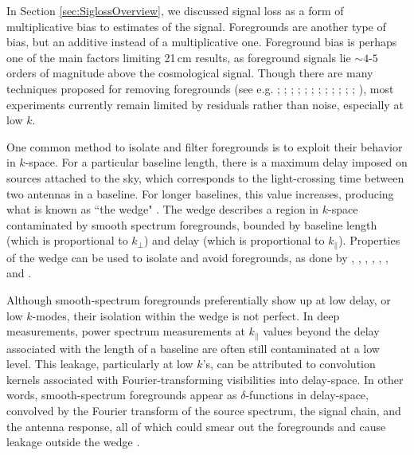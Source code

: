 \documentclass[preprint2,numberedappendix,tighten]{aastex6}  %
\begin{document}
In Section \ref{sec:SiglossOverview}, we discussed signal loss as a form of multiplicative bias to estimates of the signal. Foregrounds are another type of bias, but an additive instead of a multiplicative one. Foreground bias is perhaps one of the main factors limiting 21\,cm results, as foreground signals lie $\sim4$-$5$ orders of 
magnitude above the cosmological signal. Though there are many techniques proposed for removing foregrounds (see e.g. \citealt{vedantham_et_al2012}; \citealt{chapman_et_al2012}; \citealt{parsons_et_al2012a}; \citealt{parsons_et_al2012b}; \citealt{dillon_et_al2013a}; \citealt{wang_et_al2013}; \citealt{parsons_et_al2014}; \citealt{liu_et_al2014a}; \citealt{wolz_et_al2014}; \citealt{liu_et_al2014b}; \citealt{dillon_et_al2015}; \citealt{pober_et_al2016a}; \citealt{trott_et_al2016}), most 
experiments currently remain limited by residuals rather than noise, especially at low $k$.

One common method to isolate and filter foregrounds is to exploit their behavior in $k$-space. For a particular 
baseline length, there is a maximum delay imposed on sources attached to the sky, which corresponds to the light-crossing time between two 
antennas in a baseline. For longer baselines, this value increases, producing what is known as ``the 
wedge"
\citep{datta_et_al2010, parsons_et_al2012b, vedantham_et_al2012, pober_et_al2013, thyagarajan_et_al2013, liu_et_al2014a, liu_et_al2014b, patil_et_al2017}. 
The wedge describes a region in $k$-space contaminated by smooth spectrum foregrounds, bounded by baseline length (which is proportional to $k_{\perp}$) and delay (which is 
proportional to $k_{\parallel}$). Properties of the wedge can be used to isolate and 
avoid foregrounds, as done by , 
\citet{parsons_et_al2014}, \citet{dillon_et_al2014}, \citet{dillon_et_al2015}, \citet{jacobs_et_al2015}, \citet{beardsley_et_al2016}, and \citet{trott_et_al2016}.

Although smooth-spectrum foregrounds preferentially show up at low delay, or low $k$-modes, their isolation within the wedge is not perfect. In deep measurements, power spectrum measurements at $k_{\parallel}$ values beyond 
the delay associated with the length of a baseline are often still contaminated at a low level. This leakage, particularly at low $k$'s, can be attributed to 
convolution kernels associated with Fourier-transforming visibilities into delay-space. In other words, smooth-spectrum 
foregrounds appear as $\delta$-functions in delay-space, convolved by the Fourier transform of the source spectrum, the signal chain, and the 
antenna response, all of which could smear out the foregrounds and cause leakage outside the wedge \citep[e.g.][]{ewall-wice_et_al2017, kerrigan_et_al2018}.
\end{document}
